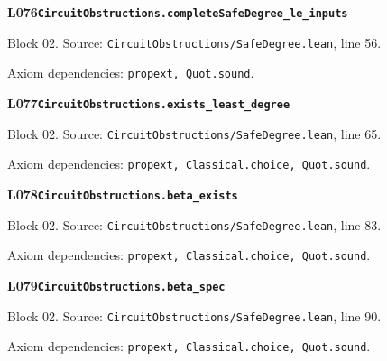 \begin{minipage}{\linewidth}
\hypertarget{L076}{}
{\small\sffamily\bfseries\color{ink}L076\quad\nolinkurl{CircuitObstructions.completeSafeDegree_le_inputs}}\par
{\scriptsize\sffamily\color{muted}Block 02. Source: \nolinkurl{CircuitObstructions/SafeDegree.lean}, line 56.}\par
{}
{\scriptsize\sffamily\color{muted}Axiom dependencies: \nolinkurl{propext, Quot.sound}.}
\end{minipage}\par\medskip
\begin{minipage}{\linewidth}
\hypertarget{L077}{}
{\small\sffamily\bfseries\color{ink}L077\quad\nolinkurl{CircuitObstructions.exists_least_degree}}\par
{\scriptsize\sffamily\color{muted}Block 02. Source: \nolinkurl{CircuitObstructions/SafeDegree.lean}, line 65.}\par
{}
{\scriptsize\sffamily\color{muted}Axiom dependencies: \nolinkurl{propext, Classical.choice, Quot.sound}.}
\end{minipage}\par\medskip
{}\par\medskip
\begin{minipage}{\linewidth}
\hypertarget{L078}{}
{\small\sffamily\bfseries\color{ink}L078\quad\nolinkurl{CircuitObstructions.beta_exists}}\par
{\scriptsize\sffamily\color{muted}Block 02. Source: \nolinkurl{CircuitObstructions/SafeDegree.lean}, line 83.}\par
{}
{\scriptsize\sffamily\color{muted}Axiom dependencies: \nolinkurl{propext, Classical.choice, Quot.sound}.}
\end{minipage}\par\medskip
\begin{minipage}{\linewidth}
\hypertarget{L079}{}
{\small\sffamily\bfseries\color{ink}L079\quad\nolinkurl{CircuitObstructions.beta_spec}}\par
{\scriptsize\sffamily\color{muted}Block 02. Source: \nolinkurl{CircuitObstructions/SafeDegree.lean}, line 90.}\par
{}
{\scriptsize\sffamily\color{muted}Axiom dependencies: \nolinkurl{propext, Classical.choice, Quot.sound}.}
\end{minipage}\par\medskip
